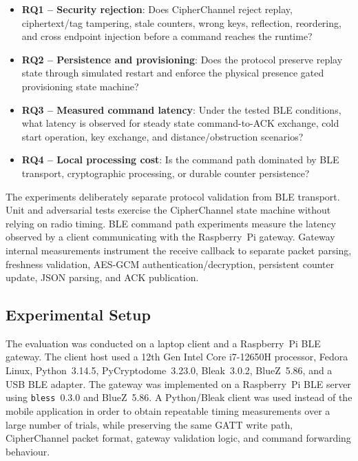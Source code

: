 \documentclass[journal]{IEEEtran}
\begin{document}
\begin{itemize}
  \item \textbf{RQ1 -- Security rejection}: Does CipherChannel reject replay, ciphertext/tag tampering, stale counters, wrong keys, reflection, reordering, and cross endpoint injection before a command reaches the runtime?

  \item \textbf{RQ2 -- Persistence and provisioning}: Does the protocol preserve replay state through simulated restart and enforce the physical presence gated provisioning state machine?

  \item \textbf{RQ3 -- Measured command latency}: Under the tested BLE conditions, what latency is observed for steady state command-to-ACK exchange, cold start operation, key exchange, and distance/obstruction scenarios?

  \item \textbf{RQ4 -- Local processing cost}: Is the command path dominated by BLE transport, cryptographic processing, or durable counter persistence?
\end{itemize}

The experiments deliberately separate protocol validation from BLE transport. Unit and adversarial tests exercise the CipherChannel state machine without relying on radio timing. BLE command path experiments measure the latency observed by a client communicating with the Raspberry~Pi gateway. Gateway internal measurements instrument the receive callback to separate packet parsing, freshness validation, AES-GCM authentication/decryption, persistent counter update, JSON parsing, and ACK publication.

\subsection{Experimental Setup}

The evaluation was conducted on a laptop client and a Raspberry~Pi BLE gateway. The client host used a 12th Gen Intel Core i7-12650H processor, Fedora Linux, Python~3.14.5, PyCryptodome~3.23.0, Bleak~3.0.2, BlueZ~5.86, and a USB BLE adapter. The gateway was implemented on a Raspberry~Pi BLE server using \texttt{bless}~0.3.0 and BlueZ~5.86. A Python/Bleak client was used instead of the mobile application in order to obtain repeatable timing measurements over a large number of trials, while preserving the same GATT write path, CipherChannel packet format, gateway validation logic, and command forwarding behaviour.
\end{document}
